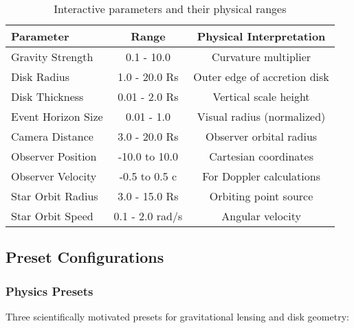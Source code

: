 \documentclass[12pt,a4paper]{article}
\theoremstyle{definition}
\theoremstyle{remark}
\begin{document}
\begin{table}[H]
\centering
\caption{Interactive parameters and their physical ranges}
\begin{tabular}{lcc}
\toprule
\textbf{Parameter} & \textbf{Range} & \textbf{Physical Interpretation} \\
\midrule
Gravity Strength & 0.1 - 10.0 & Curvature multiplier \\
Disk Radius & 1.0 - 20.0 Rs & Outer edge of accretion disk \\
Disk Thickness & 0.01 - 2.0 Rs & Vertical scale height \\
Event Horizon Size & 0.01 - 1.0 & Visual radius (normalized) \\
Camera Distance & 3.0 - 20.0 Rs & Observer orbital radius \\
Observer Position & -10.0 to 10.0 & Cartesian coordinates \\
Observer Velocity & -0.5 to 0.5 c & For Doppler calculations \\
Star Orbit Radius & 3.0 - 15.0 Rs & Orbiting point source \\
Star Orbit Speed & 0.1 - 2.0 rad/s & Angular velocity \\
\bottomrule
\end{tabular}
\label{tab:parameter_ranges}
\end{table}

\subsection{Preset Configurations}

\subsubsection{Physics Presets}

Three scientifically motivated presets for gravitational lensing and disk geometry:
\end{document}

